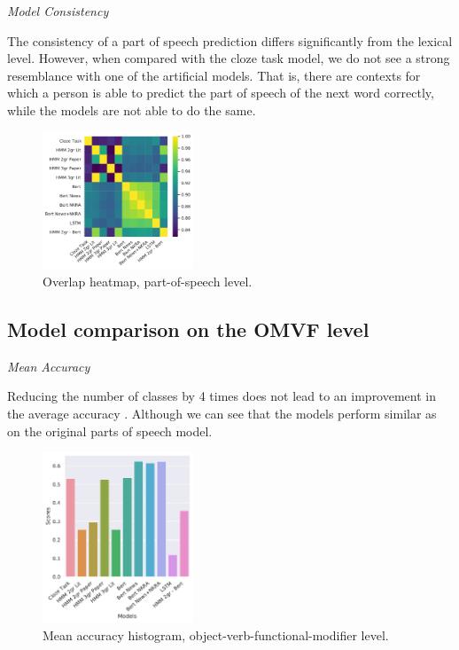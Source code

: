 \documentclass[a4paper]{article}
\newcommand{\head}[1]{\vspace{0.5em}\emph{#1}\vspace{0.25em}}
\begin{document}
\head{Model Consistency}

The consistency of a part of speech prediction differs significantly from the lexical level. However, when compared with the cloze task model, we do not see a strong resemblance with one of the artificial models. That is, there are contexts for which a person is able to predict the part of speech of the next word correctly, while the models are not able to do the same.

\begin{figure}
\label{fig:heatmap-context-accord-pos}
\caption{Overlap heatmap, part-of-speech level.}
\centering
\includegraphics[width=0.4\textwidth]{figures/pdf/heatmap-context-accord-pos.pdf}
\end{figure}


\subsection{Model comparison on the OMVF level} %

\head{Mean Accuracy}

Reducing the number of classes by 4 times does not lead to an improvement in the average accuracy
. Although we can see that the models perform similar as on the original parts of speech model.

\begin{figure}
\caption{Mean accuracy histogram, object-verb-functional-modifier level.}
\label{fig:mean-accuracy-hist-ovfm}
\centering
\includegraphics[width=0.4\textwidth]{figures/pdf/mean-accuracy-hist-ovfm.pdf}
\end{figure}
\end{document}
